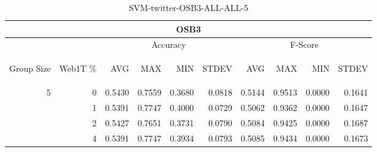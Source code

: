 \begin{center}
\begin{table}[htbp] 
 \begin{center}
\begin{tabular}{ | r | r | r | r | r | r | r | r | r | r |}
\hline
\multicolumn{10}{|c|}{OSB3}\\
\hline
 & & \multicolumn{4}{|c|}{Accuracy} & \multicolumn{4}{|c|}{F-Score}\\ \cline{3-10}
\begin{sideways}Group Size\end{sideways} & \begin{sideways}Web1T \%\end{sideways} & \begin{sideways}AVG\end{sideways} & \begin{sideways}MAX\end{sideways} & \begin{sideways}MIN\end{sideways} & \begin{sideways}STDEV\end{sideways} & \begin{sideways}AVG\end{sideways} & \begin{sideways}MAX\end{sideways} & \begin{sideways}MIN\end{sideways} & \begin{sideways}STDEV\end{sideways}\\
\hline
\multirow{3}{*}{5}
 & 0 & 0.5430 & 0.7559 & 0.3680 & 0.0818 & 0.5144 & 0.9513 & 0.0000 & 0.1641\\ \cline{2-10}
 & 1 & 0.5391 & 0.7747 & 0.4000 & 0.0729 & 0.5062 & 0.9362 & 0.0000 & 0.1647\\ \cline{2-10}
 & 2 & 0.5427 & 0.7651 & 0.3731 & 0.0790 & 0.5084 & 0.9425 & 0.0000 & 0.1687\\ \cline{2-10}
 & 4 & 0.5391 & 0.7747 & 0.3934 & 0.0793 & 0.5085 & 0.9434 & 0.0000 & 0.1673\\ \cline{2-10}
\hline
\end{tabular}
\caption{SVM-twitter-OSB3-ALL-ALL-5}
\label{table:SVM-twitter-OSB3-ALL-ALL-5}
\end{center}
 \end{table}
\end{center}

